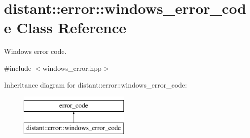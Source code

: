 \hypertarget{classdistant_1_1error_1_1windows__error__code}{}\section{distant\+:\+:error\+:\+:windows\+\_\+error\+\_\+code Class Reference}
\label{classdistant_1_1error_1_1windows__error__code}


Windows error code.  




{\ttfamily \#include $<$windows\+\_\+error.\+hpp$>$}

Inheritance diagram for distant\+:\+:error\+:\+:windows\+\_\+error\+\_\+code\+:\begin{figure}[H]
\begin{center}
\leavevmode
\includegraphics[height=2.000000cm]{classdistant_1_1error_1_1windows__error__code}
\end{center}
\end{figure}
